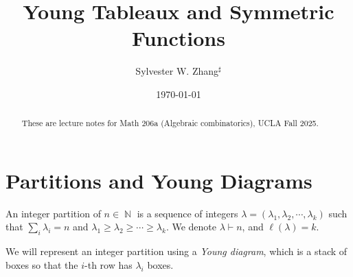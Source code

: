 \documentclass{amsart}
\title{Young Tableaux and Symmetric Functions}
\author{Sylvester W. Zhang$^\sharp$}
\date{\today}
\theoremstyle{plain}
\theoremstyle{definition}
\DeclareMathOperator{\nn}{\mathbb{N}}
\begin{document}
\maketitle

\begin{abstract}
	These are lecture notes for Math 206a (Algebraic combinatorics), UCLA Fall 2025.
\end{abstract}
\tableofcontents
\section{Partitions and Young Diagrams}
An integer partition of $n\in\nn $ is a sequence of integers $\lambda=(\lambda_1,\lambda_2,\cdots,\lambda_k)$ such that $\sum_{i}\lambda_i=n$ and $\lambda_1\geq\lambda_2\geq\cdots \geq \lambda_k$. We denote $\lambda\vdash n$, and $\ell(\lambda)=k$.

We will represent an integer partition using a \emph{Young diagram}, which is a stack of boxes so that the $i$-th row has $\lambda_i$ boxes. 


	
\end{document}
